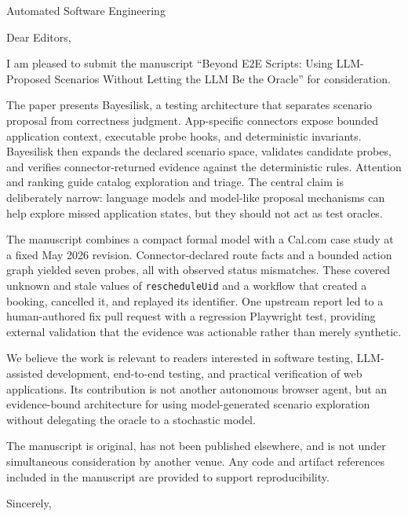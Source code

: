 \documentclass[11pt]{letter}
\date{\today}
\begin{document}
\begin{letter}{Automated Software Engineering}

\opening{Dear Editors,}

I am pleased to submit the manuscript ``Beyond E2E Scripts: Using
LLM-Proposed Scenarios Without Letting the LLM Be the Oracle'' for
consideration.

The paper presents Bayesilisk, a testing architecture that separates scenario
proposal from correctness judgment. App-specific connectors expose bounded
application context, executable probe hooks, and deterministic invariants.
Bayesilisk then expands the declared scenario space, validates candidate probes,
and verifies connector-returned evidence against the deterministic rules.
Attention and ranking guide catalog exploration and triage. The central claim
is deliberately narrow: language
models and model-like proposal mechanisms can help explore missed application
states, but they should not act as test oracles.

The manuscript combines a compact formal model with a Cal.com case study at a
fixed May 2026 revision. Connector-declared route facts and a bounded action
graph yielded seven probes, all with observed status mismatches. These covered
unknown and stale values of \texttt{rescheduleUid} and a workflow that created
a booking, cancelled it, and replayed its identifier. One upstream report led
to a human-authored fix pull request with a regression Playwright test,
providing external validation that the evidence was actionable rather than
merely synthetic.

We believe the work is relevant to readers interested in software testing,
LLM-assisted development, end-to-end testing, and practical verification of web
applications. Its contribution is not another autonomous browser agent, but an
evidence-bound architecture for using model-generated scenario exploration
without delegating the oracle to a stochastic model.

The manuscript is original, has not been published elsewhere, and is not under
simultaneous consideration by another venue. Any code and artifact references
included in the manuscript are provided to support reproducibility.

\closing{Sincerely,}

\end{letter}
\end{document}
